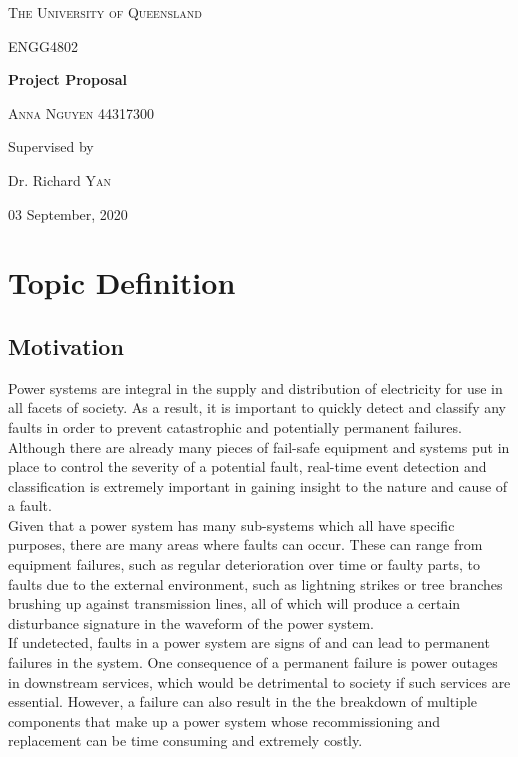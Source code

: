 \documentclass[12pt]{article}
\begin{document}
\begin{titlepage}
	\centering
	\vspace{1cm}
	{\scshape\LARGE The University of Queensland \par}
	\vspace{1cm}
	{\scshape\Large ENGG4802\par}
	\vspace{1.5cm}
	{\huge\bfseries Project Proposal \par}
	\vspace{2cm}
	{\Large\scshape Anna Nguyen 44317300\par}
	\vfill
	Supervised by\par
	Dr. Richard \textsc{Yan}

	\vfill

	{\large 03 September, 2020\par}
\end{titlepage}

\tableofcontents

\newpage
\section{Topic Definition}
\subsection{Motivation}
Power systems are integral in the supply and distribution of electricity for use in all facets of society. As a result, it is important to quickly detect and classify any faults in order to prevent catastrophic and potentially permanent failures. Although there are already many pieces of fail-safe equipment and systems put in place to  control the severity of a potential fault, real-time event detection and classification is extremely important in gaining insight to the nature and cause of a fault. \newline 
\\
Given that a power system has many sub-systems which all have specific purposes, there are many areas where faults can occur. These can range from equipment failures, such as regular deterioration over time or faulty parts, to faults due to the external environment, such as lightning strikes or tree branches brushing up against transmission lines, all of which will produce a certain disturbance signature in the waveform of the power system. \newline 
\\
If undetected, faults in a power system are signs of and can lead to permanent failures in the system. One consequence of a permanent failure is power outages in downstream services, which would be detrimental to society if such services are essential. However, a failure can also result in the the breakdown of multiple components that make up a power system whose recommissioning and replacement can be time consuming and extremely costly. 
\end{document}
